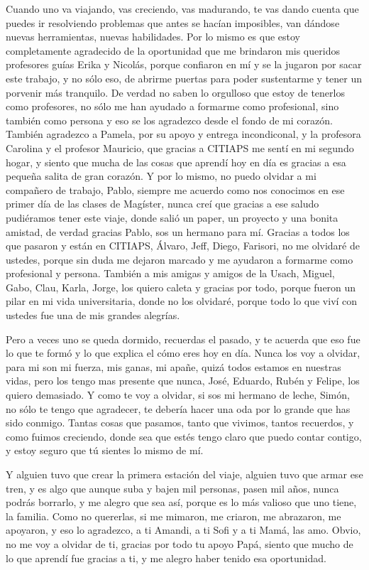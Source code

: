 \begin{agradecimiento}
Cuando uno va viajando, vas creciendo, vas madurando, te vas dando cuenta que puedes ir resolviendo problemas que antes se hacían imposibles, van dándose nuevas herramientas, nuevas habilidades. Por lo mismo es que estoy completamente agradecido de la oportunidad que me brindaron mis queridos profesores guías Erika y Nicolás, porque confiaron en mí y se la jugaron por sacar este trabajo, y no sólo eso, de abrirme puertas para poder sustentarme y tener un porvenir más tranquilo. De verdad no saben lo orgulloso que estoy de tenerlos como profesores, no sólo me han ayudado a formarme como profesional, sino también como persona y eso se los agradezco desde el fondo de mi corazón. También agradezco a Pamela, por su apoyo y entrega incondiconal, y la profesora Carolina y el profesor Mauricio, que gracias a CITIAPS me sentí en mi segundo hogar, y siento que mucha de las cosas que aprendí hoy en día es gracias a esa pequeña salita de gran corazón. Y por lo mismo, no puedo olvidar a mi compañero de trabajo, Pablo, siempre me acuerdo como nos conocimos en ese primer día de las clases de Magíster, nunca creí que gracias a ese saludo pudiéramos tener este viaje, donde salió un paper, un proyecto y una bonita amistad, de verdad gracias Pablo, sos un hermano para mí. Gracias a todos los que pasaron y están en CITIAPS, Álvaro, Jeff, Diego, Farisori, no me olvidaré de ustedes, porque sin duda me dejaron marcado y me ayudaron a formarme como profesional y persona. También a mis amigas y amigos de la Usach, Miguel, Gabo, Clau, Karla, Jorge, los quiero caleta y gracias por todo, porque fueron un pilar en mi vida universitaria, donde no los olvidaré, porque todo lo que viví con ustedes fue una de mis grandes alegrías.

Pero a veces uno se queda dormido, recuerdas el pasado, y te acuerda que eso fue lo que te formó y lo que explica el cómo eres hoy en día. Nunca los voy a olvidar, para mi son mi fuerza, mis ganas, mi apañe, quizá todos estamos en nuestras vidas, pero los tengo mas presente que nunca, José, Eduardo, Rubén y Felipe, los quiero demasiado. Y como te voy a olvidar, si sos mi hermano de leche, Simón, no sólo te tengo que agradecer, te debería hacer una oda por lo grande que has sido conmigo. Tantas cosas que pasamos, tanto que vivimos, tantos recuerdos, y como fuimos creciendo, donde sea que estés tengo claro que puedo contar contigo, y estoy seguro que tú sientes lo mismo de mí.

Y alguien tuvo que crear la primera estación del viaje, alguien tuvo que armar ese tren, y es algo que aunque suba y bajen mil personas, pasen mil años, nunca podrás borrarlo, y me alegro que sea así, porque es lo más valioso que uno tiene, la familia. Como no quererlas, si me mimaron, me criaron, me abrazaron, me apoyaron, y eso lo agradezco, a ti Amandi, a ti Sofi y a ti Mamá, las amo. Obvio, no me voy a olvidar de ti, gracias por todo tu apoyo Papá, siento que mucho de lo que aprendí fue gracias a ti, y me alegro haber tenido esa oportunidad.
\end{agradecimiento}